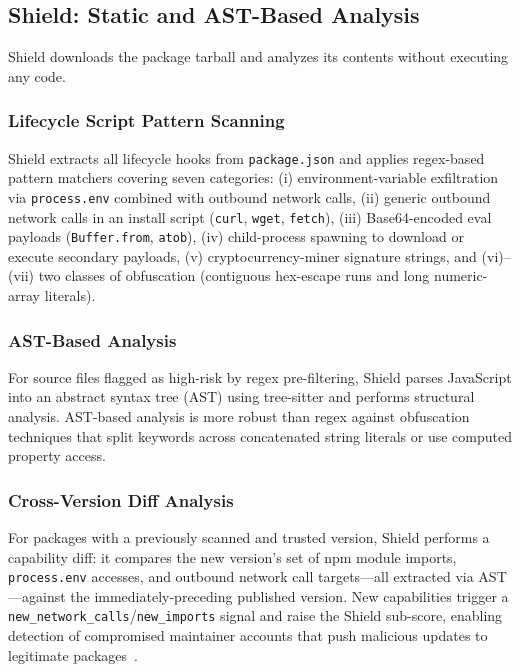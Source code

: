 \documentclass[journal]{IEEEtran}
\begin{document}
\subsection{Shield: Static and AST-Based Analysis}
Shield downloads the package tarball and analyzes its contents without executing any code.

\subsubsection{Lifecycle Script Pattern Scanning}
Shield extracts all lifecycle hooks from \texttt{package.json} and applies regex-based pattern matchers
covering seven categories: (i) environment-variable exfiltration via \texttt{process.env} combined with
outbound network calls, (ii) generic outbound network calls in an install script (\texttt{curl},
\texttt{wget}, \texttt{fetch}), (iii) Base64-encoded eval payloads (\texttt{Buffer.from}, \texttt{atob}),
(iv) child-process spawning to download or execute secondary payloads, (v) cryptocurrency-miner signature
strings, and (vi)--(vii) two classes of obfuscation (contiguous hex-escape runs and long numeric-array
literals).

\subsubsection{AST-Based Analysis}
For source files flagged as high-risk by regex pre-filtering, Shield parses JavaScript into an abstract
syntax tree (AST) using tree-sitter and performs structural analysis. AST-based analysis is more robust than
regex against obfuscation techniques that split keywords across concatenated string literals or use computed
property access.

\subsubsection{Cross-Version Diff Analysis}
For packages with a previously scanned and trusted version, Shield performs a capability diff: it compares
the new version's set of npm module imports, \texttt{process.env} accesses, and outbound network call
targets---all extracted via AST---against the immediately-preceding published version. New capabilities
trigger a \texttt{new\_network\_calls}/\texttt{new\_imports} signal and raise the Shield sub-score, enabling
detection of compromised maintainer accounts that push malicious updates to legitimate
packages~\cite{froh2023}.
\end{document}

